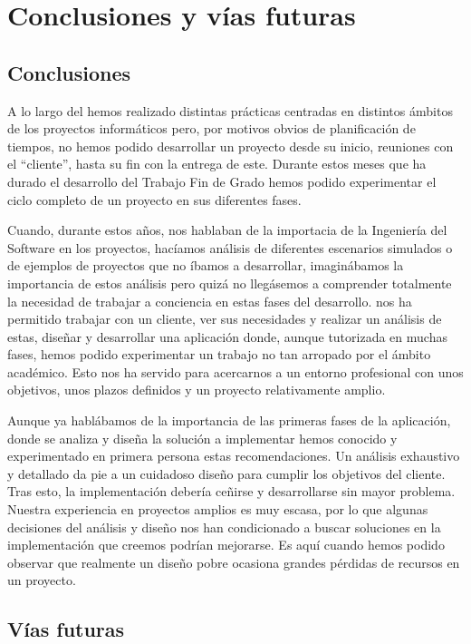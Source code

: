 \chapter{Conclusiones y vías futuras}

\section{Conclusiones}
\bigskip
	A lo largo del {\grado} hemos realizado distintas prácticas centradas en distintos ámbitos de los proyectos informáticos pero, por motivos obvios de planificación de tiempos, no hemos podido desarrollar un proyecto desde su inicio, reuniones con el ``cliente'', hasta su fin con la entrega de este.  Durante estos meses que ha durado el desarrollo del Trabajo Fin de Grado hemos podido experimentar el ciclo completo de un proyecto en sus diferentes fases. 

\bigskip
	Cuando, durante estos años, nos hablaban de la importacia de la Ingeniería del Software en los proyectos, hacíamos análisis de diferentes escenarios simulados o de ejemplos de proyectos que no íbamos a desarrollar, imaginábamos la importancia de estos análisis pero quizá no llegásemos a comprender totalmente la necesidad de trabajar a conciencia en estas fases del desarrollo. {\titulo} nos ha permitido trabajar con un cliente, ver sus necesidades y realizar un análisis de estas, diseñar  y desarrollar una aplicación donde, aunque tutorizada en muchas fases, hemos podido experimentar un trabajo no tan arropado por el ámbito académico. Esto nos ha servido para acercarnos a un entorno profesional con unos objetivos, unos plazos definidos y un proyecto relativamente amplio.

\bigskip
	Aunque ya hablábamos de la importancia de las primeras fases de la aplicación, donde se analiza y diseña la solución a implementar hemos conocido y experimentado en primera persona estas recomendaciones. Un análisis exhaustivo y detallado da pie a un cuidadoso diseño para cumplir los objetivos del cliente. Tras esto, la implementación debería ceñirse y desarrollarse sin mayor problema. Nuestra experiencia en proyectos amplios es muy escasa, por lo que algunas decisiones del análisis y diseño nos han condicionado a buscar soluciones en la implementación que creemos podrían mejorarse. Es aquí cuando hemos podido observar que realmente un diseño pobre ocasiona grandes pérdidas de recursos en un proyecto.

\section{Vías futuras}	

